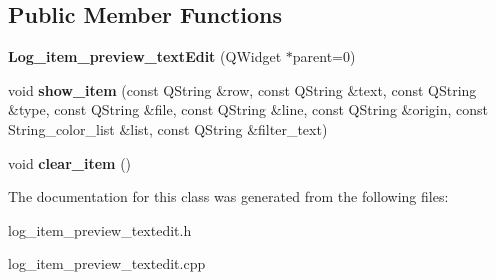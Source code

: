 \subsection*{Public Member Functions}
\begin{DoxyCompactItemize}
\item 
\hypertarget{class_log__item__preview__text_edit_ad38f39a5635662a9720661c2adc1a707}{{\bfseries Log\-\_\-item\-\_\-preview\-\_\-text\-Edit} (Q\-Widget $\ast$parent=0)}\label{class_log__item__preview__text_edit_ad38f39a5635662a9720661c2adc1a707}

\item 
\hypertarget{class_log__item__preview__text_edit_a4c6a931ec095bf471ba7a6239851e8e3}{void {\bfseries show\-\_\-item} (const Q\-String \&row, const Q\-String \&text, const Q\-String \&type, const Q\-String \&file, const Q\-String \&line, const Q\-String \&origin, const String\-\_\-color\-\_\-list \&list, const Q\-String \&filter\-\_\-text)}\label{class_log__item__preview__text_edit_a4c6a931ec095bf471ba7a6239851e8e3}

\item 
\hypertarget{class_log__item__preview__text_edit_a632986f2540bbbdf480214156b73538e}{void {\bfseries clear\-\_\-item} ()}\label{class_log__item__preview__text_edit_a632986f2540bbbdf480214156b73538e}

\end{DoxyCompactItemize}


The documentation for this class was generated from the following files\-:\begin{DoxyCompactItemize}
\item 
log\-\_\-item\-\_\-preview\-\_\-textedit.\-h\item 
log\-\_\-item\-\_\-preview\-\_\-textedit.\-cpp\end{DoxyCompactItemize}
